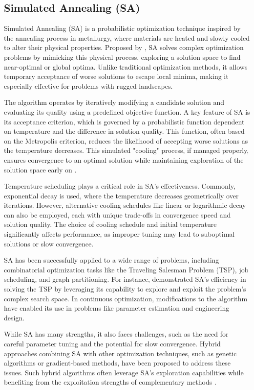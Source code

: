 \subsection{Simulated Annealing (SA)}
Simulated Annealing (SA) is a probabilistic optimization technique inspired by the annealing process in metallurgy, where materials are heated and slowly cooled to alter their physical properties. Proposed by \textcite{kirkpatrick1983optimization}, SA solves complex optimization problems by mimicking this physical process, exploring a solution space to find near-optimal or global optima. Unlike traditional optimization methods, it allows temporary acceptance of worse solutions to escape local minima, making it especially effective for problems with rugged landscapes.

The algorithm operates by iteratively modifying a candidate solution and evaluating its quality using a predefined objective function. A key feature of SA is its acceptance criterion, which is governed by a probabilistic function dependent on temperature and the difference in solution quality. This function, often based on the Metropolis criterion, reduces the likelihood of accepting worse solutions as the temperature decreases. This simulated "cooling" process, if managed properly, ensures convergence to an optimal solution while maintaining exploration of the solution space early on \parencite{aarts1989simulated}.

Temperature scheduling plays a critical role in SA's effectiveness. Commonly, exponential decay is used, where the temperature decreases geometrically over iterations. However, alternative cooling schedules like linear or logarithmic decay can also be employed, each with unique trade-offs in convergence speed and solution quality. The choice of cooling schedule and initial temperature significantly affects performance, as improper tuning may lead to suboptimal solutions or slow convergence.

SA has been successfully applied to a wide range of problems, including combinatorial optimization tasks like the Traveling Salesman Problem (TSP), job scheduling, and graph partitioning. For instance, \textcite{johnson1991optimization} demonstrated SA's efficiency in solving the TSP by leveraging its capability to explore and exploit the problem's complex search space. In continuous optimization, modifications to the algorithm have enabled its use in problems like parameter estimation and engineering design.

While SA has many strengths, it also faces challenges, such as the need for careful parameter tuning and the potential for slow convergence. Hybrid approaches combining SA with other optimization techniques, such as genetic algorithms or gradient-based methods, have been proposed to address these issues. Such hybrid algorithms often leverage SA's exploration capabilities while benefiting from the exploitation strengths of complementary methods \parencite{yang2010engineering}.

